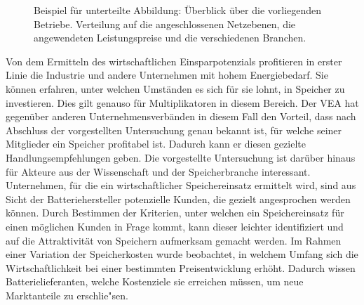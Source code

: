 \begin{figure}[!tb]
\begin{minipage}{\textwidth}
{			%
			\label{fig:BraGrpvert}}
		\hfill
	\end{minipage}
	\caption[Verteilung der Betriebe auf Netzebenen, Leistungspreise und Branchen]{Beispiel für unterteilte Abbildung: Überblick über die vorliegenden Betriebe. Verteilung auf die angeschlossenen Netzebenen, die angewendeten Leistungspreise und die verschiedenen Branchen.}
	\label{fig:Verteilungen}
\end{figure}
%
Von dem Ermitteln des wirtschaftlichen Einsparpotenzials profitieren in erster Linie die Industrie und andere Unternehmen mit hohem Energiebedarf.
Sie können erfahren, unter welchen Umständen es sich für sie lohnt, in Speicher zu investieren.
Dies gilt genauso für Multiplikatoren in diesem Bereich.
Der \ac{VEA} hat gegenüber anderen Unternehmensverbänden in diesem Fall den Vorteil, dass nach Abschluss der vorgestellten Untersuchung genau bekannt ist, für welche seiner Mitglieder ein Speicher profitabel ist.
Dadurch kann er diesen gezielte Handlungsempfehlungen geben.
Die vorgestellte Untersuchung ist darüber hinaus für Akteure aus der Wissenschaft und der Speicherbranche interessant.
Unternehmen, für die ein wirtschaftlicher Speichereinsatz ermittelt wird, sind aus Sicht der Batteriehersteller potenzielle Kunden, die gezielt angesprochen werden können.
Durch Bestimmen der Kriterien, unter welchen ein Speichereinsatz für einen möglichen Kunden in Frage kommt, kann dieser leichter identifiziert und auf die Attraktivität von Speichern aufmerksam gemacht werden.
Im Rahmen einer Variation der Speicherkosten wurde beobachtet, in welchem Umfang sich die Wirtschaftlichkeit bei einer bestimmten Preisentwicklung erhöht.
Dadurch wissen Batterielieferanten, welche Kostenziele sie erreichen müssen, um neue Marktanteile zu erschlie"sen.
